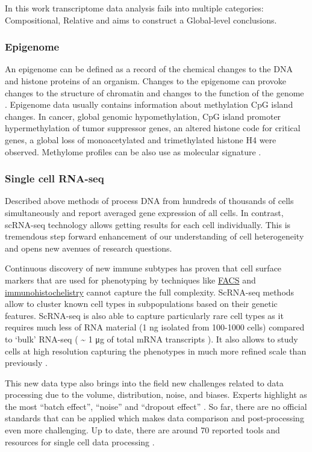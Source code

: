 \documentclass[12pt,]{book}
\theoremstyle{definition}
\theoremstyle{definition}
\theoremstyle{definition}
\theoremstyle{remark}
\begin{document}
In this work transcriptome data analysis fails into multiple categories:
Compositional, Relative and aims to construct a Global-level
conclusions.

\hypertarget{epigenome}{%
\subsubsection{Epigenome}\label{epigenome}}

An epigenome can be defined as a record of the chemical changes to the
DNA and histone proteins of an organism. Changes to the epigenome can
provoke changes to the structure of chromatin and changes to the
function of the genome \citep{Bernstein2007}. Epigenome data usually
contains information about methylation CpG island changes. In cancer,
global genomic hypomethylation, CpG island promoter hypermethylation of
tumor suppressor genes, an altered histone code for critical genes, a
global loss of monoacetylated and trimethylated histone H4 were
observed. Methylome profiles can be also use as molecular signature
\citep{Jeschke2017}.

\hypertarget{single-cell-rna-seq}{%
\subsubsection{Single cell RNA-seq}\label{single-cell-rna-seq}}

Described above methods of process DNA from hundreds of thousands of
cells simultaneously and report averaged gene expression of all cells.
In contrast, scRNA-seq technology allows getting results for each cell
individually. This is tremendous step forward enhancement of our
understanding of cell heterogeneity and opens new avenues of research
questions.

Continuous discovery of new immune subtypes has proven that cell surface
markers that are used for phenotyping by techniques like
\protect\hyperlink{facs}{FACS} and
\protect\hyperlink{staining}{immunohistochelistry} cannot capture the
full complexity. ScRNA-seq methods allow to cluster known cell types in
subpopulations based on their genetic features. ScRNA-seq is also able
to capture particularly rare cell types as it requires much less of RNA
material (1 ng isolated from 100-1000 cells) compared to `bulk' RNA-seq
( \textasciitilde{} 1 μg of total mRNA transcripts ). It also allows to
study cells at high resolution capturing the phenotypes in much more
refined scale than previously \citep{Papalexi2017}.

This new data type also brings into the field new challenges related to
data processing due to the volume, distribution, noise, and biases.
Experts highlight as the most ``batch effect'', ``noise'' and ``dropout
effect'' \citep{Perkel2017}. So far, there are no official standards
that can be applied which makes data comparison and post-processing even
more challenging. Up to date, there are around 70 reported tools and
resources for single cell data processing \citep{Davis2016} .
\end{document}
